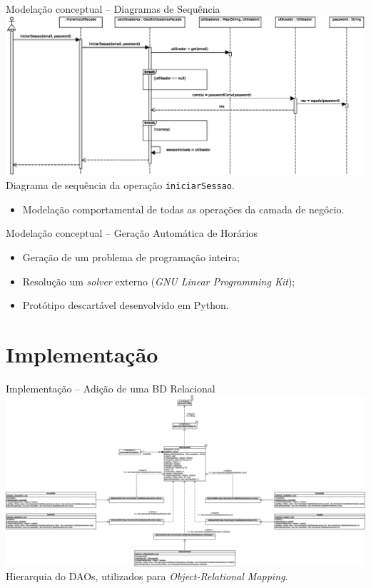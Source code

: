 \documentclass[13pt, handout]{beamer}
\begin{document}
\begin{frame}{Modelação conceptual -- Diagramas de Sequência}
    \centering
    \includegraphics[scale=0.35]{Imagens/Modelos/iniciarSessao.svg.eps} \\
    {\scriptsize Diagrama de sequência da operação \texttt{iniciarSessao}.}

    \vspace{0.5cm}
    \begin{itemize}
        \item Modelação comportamental de todas as operações da camada de negócio.
    \end{itemize}
\end{frame}

\begin{frame}{Modelação conceptual -- Geração Automática de Horários}
    \centering
    
    \begin{itemize}
        \item Geração de um problema de programação inteira;
        \item Resolução um \emph{solver} externo (\emph{GNU Linear Programming Kit});
        \item Protótipo descartável desenvolvido em Python.
    \end{itemize}
\end{frame}

\section{Implementação}

\begin{frame}{Implementação -- Adição de uma BD Relacional}
    \centering
    \includegraphics[scale=0.175]{Imagens/Modelos/HierarquiaDAO.svg.eps}
    {\scriptsize Hierarquia do DAOs, utilizados para \emph{Object-Relational Mapping}.}
\end{frame}
\end{document}
